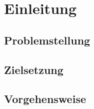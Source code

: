 \chapter{Einleitung}
\label{sec:einleitung}

\setcounter{mycounter}{\value{page}}
\setcounter{page}{1}

\section{Problemstellung}

\section{Zielsetzung}

\section{Vorgehensweise}